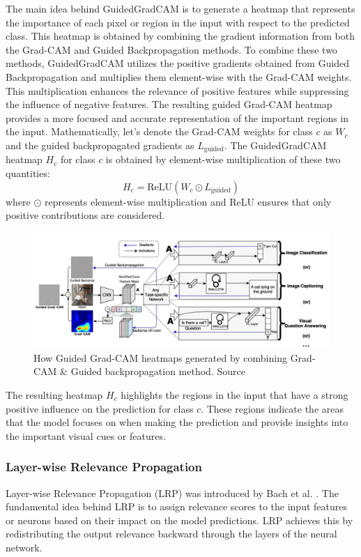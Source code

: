 The main idea behind GuidedGradCAM is to generate a heatmap that represents the importance of each pixel or region in the input with respect to the predicted class. This heatmap is obtained by combining the gradient information from both the Grad-CAM and Guided Backpropagation methods. To combine these two methods, GuidedGradCAM utilizes the positive gradients obtained from Guided Backpropagation and multiplies them element-wise with the Grad-CAM weights. This multiplication enhances the relevance of positive features while suppressing the influence of negative features. The resulting guided Grad-CAM heatmap provides a more focused and accurate representation of the important regions in the input.
Mathematically, let's denote the Grad-CAM weights for class $c$ as $W_c$ and the guided backpropagated gradients as $L_{\text{guided}}$. The GuidedGradCAM heatmap $H_c$ for class $c$ is obtained by element-wise multiplication of these two quantities:
\begin{equation}
H_c = \text{ReLU}(W_c \odot L_{\text{guided}})
\end{equation}
where $\odot$ represents element-wise multiplication and ReLU ensures that only positive contributions are considered.

\begin{figure}
\centering
\includegraphics[width=13cm]{images/xai_methods/guided-grad-cam.png}
\caption{How Guided Grad-CAM heatmaps generated by combining Grad-CAM \& Guided backpropagation method. Source \cite{grad_cam}}
\end{figure}

The resulting heatmap $H_c$ highlights the regions in the input that have a strong positive influence on the prediction for class $c$. These regions indicate the areas that the model focuses on when making the prediction and provide insights into the important visual cues or features.

\subsubsection{Layer-wise Relevance Propagation}
\label{subsubsec:lrp}
Layer-wise Relevance Propagation (LRP) was introduced by Bach et al. \cite{lrp}. The fundamental idea behind LRP is to assign relevance scores to the input features or neurons based on their impact on the model predictions. LRP achieves this by redistributing the output relevance backward through the layers of the neural network.

